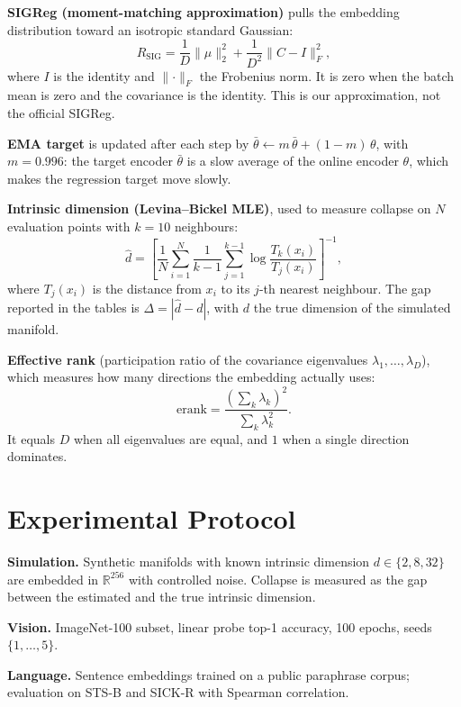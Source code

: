 \documentclass[conference]{IEEEtran}
\begin{document}
\textbf{SIGReg (moment-matching approximation)} pulls the embedding distribution toward an isotropic standard Gaussian:
\begin{equation}
R_{\mathrm{SIG}}=\frac{1}{D}\lVert\mu\rVert_2^2+\frac{1}{D^2}\lVert C-I\rVert_F^2,
\end{equation}
where $I$ is the identity and $\lVert\cdot\rVert_F$ the Frobenius norm. It is zero when the batch mean is zero and the covariance is the identity. This is our approximation, not the official SIGReg.

\textbf{EMA target} is updated after each step by $\bar\theta\leftarrow m\,\bar\theta+(1-m)\,\theta$, with $m=0.996$: the target encoder $\bar\theta$ is a slow average of the online encoder $\theta$, which makes the regression target move slowly.

\textbf{Intrinsic dimension (Levina--Bickel MLE)}, used to measure collapse on $N$ evaluation points with $k=10$ neighbours:
\begin{equation}
\hat d=\left[\frac{1}{N}\sum_{i=1}^{N}\frac{1}{k-1}\sum_{j=1}^{k-1}\log\frac{T_k(x_i)}{T_j(x_i)}\right]^{-1},
\end{equation}
where $T_j(x_i)$ is the distance from $x_i$ to its $j$-th nearest neighbour. The gap reported in the tables is $\Delta=|\hat d-d|$, with $d$ the true dimension of the simulated manifold.

\textbf{Effective rank} (participation ratio of the covariance eigenvalues $\lambda_1,\dots,\lambda_D$), which measures how many directions the embedding actually uses:
\begin{equation}
\mathrm{erank}=\frac{\left(\sum_{k}\lambda_k\right)^2}{\sum_{k}\lambda_k^2}.
\end{equation}
It equals $D$ when all eigenvalues are equal, and $1$ when a single direction dominates.

\section{Experimental Protocol}
\textbf{Simulation.} Synthetic manifolds with known intrinsic dimension $d \in \{2, 8, 32\}$ are embedded in $\mathbb{R}^{256}$ with controlled noise. Collapse is measured as the gap between the estimated and the true intrinsic dimension.

\textbf{Vision.} ImageNet-100 subset, linear probe top-1 accuracy, 100 epochs, seeds $\{1,\dots,5\}$.

\textbf{Language.} Sentence embeddings trained on a public paraphrase corpus; evaluation on STS-B and SICK-R with Spearman correlation.
\end{document}
